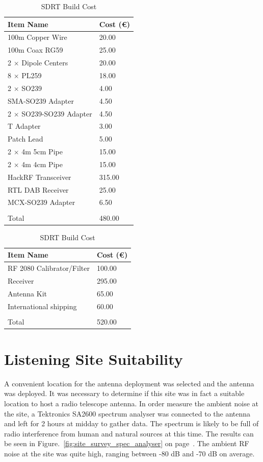 %
\begin{table}
  \centering
  \begin{tabular}{p{8cm} l}
    \toprule
    Item Name & Cost (\euro) \\ \midrule
    100m Copper Wire & 20.00  \\
    100m Coax RG59 & 25.00  \\
    2 $\times$ Dipole Centers & 20.00 \\
    8 $\times$ PL259 & 18.00 \\
    2 $\times$ SO239 & 4.00 \\
    SMA-SO239 Adapter & 4.50 \\
    2 $\times$ SO239-SO239 Adapter & 4.50 \\
    T Adapter & 3.00 \\
    Patch Lead & 5.00 \\
    2 $\times$ 4m 5cm Pipe & 15.00 \\
    2 $\times$ 4m 4cm Pipe & 15.00 \\
    HackRF Transceiver & 315.00 \\
    RTL DAB Receiver & 25.00 \\
    MCX-SO239 Adapter & 6.50 \\
    \bottomrule
    \\
    Total & 480.00
  \end{tabular}
  \caption{SDRT Build Cost}
  \label{tab:sdrt_build_cost}
\end{table}
%

%
\begin{table}
	\centering
	\begin{tabular}{p{8cm} l}
		\toprule
		Item Name & Cost (\euro) \\ \midrule
		RF 2080 Calibrator/Filter & 100.00  \\
		Receiver & 295.00  \\
		Antenna Kit & 65.00 \\
		International shipping & 60.00 \\
		\bottomrule
		\\
		Total & 520.00
	\end{tabular}
	\caption{SDRT Build Cost \citep{nasa14}}
	\label{tab:radio_jove_kit_cost}
\end{table}
%

\newpage
\section*{Listening Site Suitability}
A convenient location for the antenna deployment was selected and the antenna was deployed. It was necessary to determine if this site was in fact a suitable location to host a radio telescope antenna. In order measure the ambient noise at the site, a Tektronics SA2600 spectrum analyser was connected to the antenna and left for 2 hours at midday to gather data. The spectrum is likely to be full of radio interference from human and natural sources at this time. The results can be seen in Figure.~\ref{fig:site_survey_spec_analyser} on page~\pageref{fig:site_survey_spec_analyser}. The ambient \gls{RF} noise at the site was quite high, ranging between -80 dB and -70 dB on average. 


